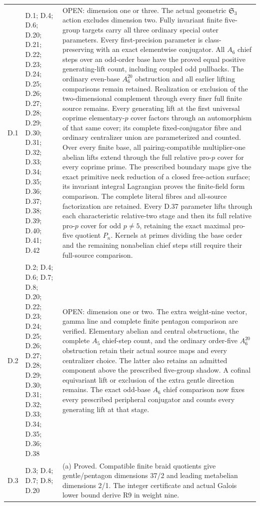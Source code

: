 \begin{longtable}{@{}p{1.1cm}p{3.0cm}p{10.3cm}@{}}
D.1 & D.1; D.4; D.6; D.20; D.21; D.22; D.23; D.24; D.25; D.26; D.27; D.28; D.29; D.30; D.31; D.32; D.33; D.34; D.35; D.36; D.37; D.38; D.39; D.40; D.41; D.42 & OPEN: dimension one or three. The actual geometric $\mathfrak S_3$ action excludes dimension two. Fully invariant finite five-group targets carry all three ordinary special outer parameters. Every first-precision parameter is class-preserving with an exact elementwise conjugator. All $A_6$ chief steps over an odd-order base have the proved equal positive generating-lift count, including coupled odd pullbacks. The ordinary even-base $A_6^{20}$ obstruction and all earlier lifting comparisons remain retained. Realization or exclusion of the two-dimensional complement through every finer full finite source remains. Every generating lift at the first universal coprime elementary-$p$ cover factors through an automorphism of that same cover; its complete fixed-conjugator fibre and ordinary centralizer union are parameterized and counted. Over every finite base, all pairing-compatible multiplier-one abelian lifts extend through the full relative pro-$p$ cover for every coprime prime. The prescribed boundary maps give the exact primitive neck reduction of a closed free-action surface; its invariant integral Lagrangian proves the finite-field form comparison. The complete literal fibres and all-source factorization are retained. Every D.37 parameter lifts through each characteristic relative-two stage and then its full relative pro-$p$ cover for odd $p\ne5$, retaining the exact maximal pro-five quotient $P_n$. Kernels at primes dividing the base order and the remaining nonabelian chief steps still require their full-source comparison. \\
D.2 & D.2; D.4; D.6; D.7; D.8; D.20; D.22; D.23; D.24; D.25; D.26; D.27; D.28; D.29; D.30; D.31; D.32; D.33; D.34; D.35; D.36; D.38 & OPEN: dimension one or two. The extra weight-nine vector, gamma line and complete finite pentagon comparison are verified. Elementary abelian and central obstructions, the complete $A_5$ chief-step count, and the ordinary order-five $A_6^{20}$ obstruction retain their actual source maps and every centralizer choice. The latter also retains an admitted component above the prescribed five-group shadow. A cofinal equivariant lift or exclusion of the extra gentle direction remains. The exact odd-base $A_6$ chief comparison now fixes every prescribed peripheral conjugator and counts every generating lift at that stage. \\
D.3 & D.3; D.4; D.7; D.8; D.20 & (a) Proved. Compatible finite braid quotients give gentle/pentagon dimensions 37/2 and leading metabelian dimensions 2/1. The integer certificate and actual Galois lower bound derive R9 in weight nine. \\

\end{longtable}
